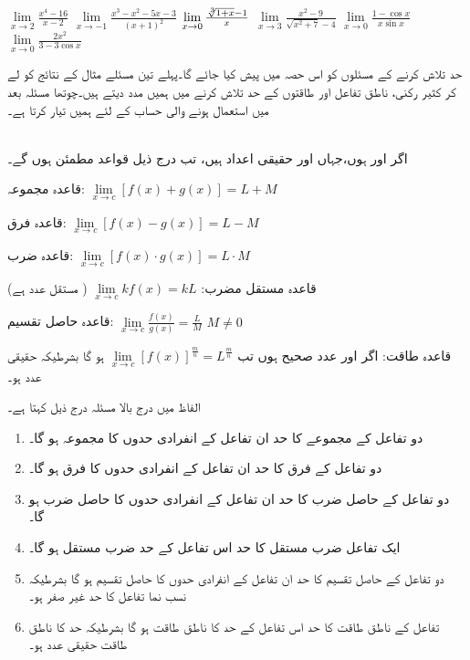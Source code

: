 $\lim\limits_{x\to 2} \tfrac{x^4-16}{x-2}$
$\lim\limits_{x\to -1} \tfrac{x^3-x^2-5x-3}{(x+1)^2}$
$\lim\limits_{x\to 0} \tfrac{\sqrt[\leftroot{-2}3]{1+x}-1}{x}$
$\lim\limits_{x\to 3} \tfrac{x^2-9}{\sqrt{x^2+7}-4}$
$\lim\limits_{x\to 0} \tfrac{1-\cos x}{x\sin x}$
$\lim\limits_{x\to 0} \tfrac{2x^2}{3-3\cos x}$

حد تلاش کرنے کے مسئلوں کو اس حصہ میں پیش کیا جائے گا۔پہلے تین مسئلے مثال  کے نتائج کو لے کر کثیر رکنی، ناطق تفاعل اور طاقتوں  کے حد تلاش کرنے میں ہمیں مدد دیتے ہیں۔چوتھا مسئلہ بعد میں استعمال ہونے والی حساب کے لئے ہمیں تیار کرتا ہے۔


\\
اگر  اور  ہوں،جہاں  اور  حقیقی اعداد ہیں،  تب درج ذیل قواعد مطمئن ہوں گے۔
\begin{description}
\item{قاعدہ مجموعہ:}\quad 
$\lim\limits_{x\to c}[f(x)+g(x)]=L+M$
\item{قاعدہ فرق:}\quad
$\lim\limits_{x\to c}[f(x)-g(x)]=L-M$
\item{قاعدہ ضرب:}\quad
$\lim\limits_{x\to c}[f(x)\cdot g(x)]=L\cdot M$
\item{قاعدہ مستقل مضرب:}\quad
$\lim\limits_{x\to c} k f(x)=kL$
\quad
( مستقل عدد ہے)
\item{قاعدہ حاصل تقسیم:}\quad
$\lim\limits_{x\to c}\tfrac{f(x)}{g(x)}=\tfrac{L}{M}$
\quad
$M\ne 0$
\item{قاعدہ طاقت:}\quad
اگر  اور  عدد صحیح ہوں تب
$\lim\limits_{x\to c}[f(x)]^{\tfrac{m}{n}}=L^{\tfrac{m}{n}}$
 ہو گا بشرطیکہ   حقیقی عدد ہو۔
\end{description}

الفاظ میں درج بالا مسئلہ درج ذیل کہتا ہے۔
\begin{enumerate}
\item
دو تفاعل کے مجموعے کا حد ان تفاعل کے انفرادی حدوں کا مجموعہ ہو گا۔
\item
دو تفاعل کے فرق  کا حد ان تفاعل کے انفرادی حدوں کا فرق ہو گا۔
\item
دو تفاعل کے حاصل ضرب  کا حد ان تفاعل کے انفرادی حدوں کا حاصل ضرب  ہو گا۔
\item
ایک تفاعل ضرب مستقل کا حد اس تفاعل کے حد ضرب مستقل ہو گا۔
\item
دو تفاعل کے حاصل تقسیم کا حد ان تفاعل کے انفرادی حدوں کا حاصل تقسیم ہو گا بشرطیکہ نسب نما تفاعل کا حد غیر صفر ہو۔
\item
تفاعل کے ناطق طاقت کا حد اس تفاعل کے حد کا ناطق طاقت ہو گا بشرطیکہ حد کا ناطق طاقت  حقیقی عدد ہو۔ 
\end{enumerate}

